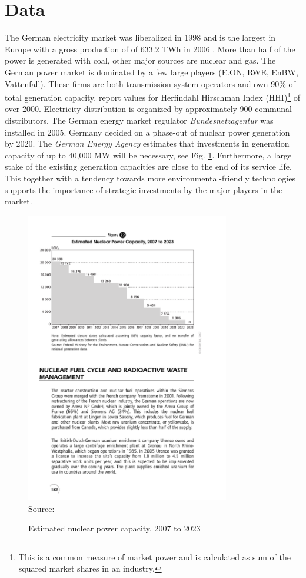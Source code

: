 \section{Data}

The German electricity market was liberalized in 1998 and is the largest in Europe with a gross production of of 633.2 TWh in 2006 \citep{IEA2007}. More than half of the power is generated with coal, other major sources are nuclear and gas. The German power market is dominated by a few large players (E.ON, RWE, EnBW, Vattenfall). These firms are both transmission system operators and own 90\% of total generation capacity. \cite{Brunekreeft2006} report values for Herfindahl Hirschman Index (HHI)\footnote{This is a common measure of market power and is calculated as sum of the squared market shares in an industry.} of over 2000. Electricity distribution is organized by approximately 900 communal distributors. The German energy market regulator  \emph{Bundesnetzagentur} was installed in 2005. Germany decided on a phase-out of nuclear power generation by 2020. The \emph{German Energy Agency} estimates that investments in generation capacity of up to 40,000 MW will be necessary, see Fig. \ref{fig:nuclear}. Furthermore, a large stake of the existing generation capacities are close to the end of its service life. This together with a tendency towards more environmental-friendly technologies supports the importance of strategic investments by the major players in the market. 

\begin{figure}[htb]
  \centering
\caption{Estimated nuclear power capacity, 2007 to 2023}
\includegraphics[width=3.5in]{germandata/nuclear.pdf}
  \label{fig:nuclear}
\\
 \scriptsize Source: \cite{IEA2007a}
\end{figure}

